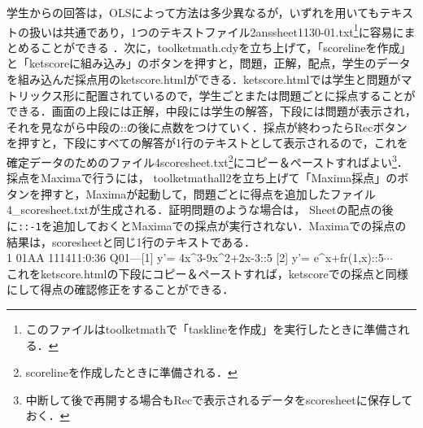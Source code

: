 \documentclass[a4j,12pt]{ujarticle}
\begin{document}
学生からの回答は，OLSによって方法は多少異なるが，いずれを用いてもテキストの扱いは共通であり，1つのテキストファイル2anssheet1130-01.txt\footnote{このファイルはtoolketmathで「tasklineを作成」を実行したときに準備される．}に容易にまとめることができる ．次に，toolketmath.cdyを立ち上げて，「scorelineを作成」と「ketscoreに組み込み」のボタンを押すと，問題，正解，配点，学生のデータを組み込んだ採点用のketscore.htmlができる．ketscore.htmlでは学生と問題がマトリックス形に配置されているので，学生ごとまたは問題ごとに採点することができる．画面の上段には正解，中段には学生の解答，下段には問題が表示され，それを見ながら中段の::の後に点数をつけていく．採点が終わったらRecボタンを押すと，下段にすべての解答が1行のテキストとして表示されるので，これを確定データのためのファイル4scoresheet.txt\footnote{scorelineを作成したときに準備される．}にコピー＆ペーストすればよい\footnote{中断して後で再開する場合もRecで表示されるデータをscoresheetに保存しておく．}．採点をMaximaで行うには，
toolketmathall2を立ち上げて「Maxima採点」のボタンを押すと，Maximaが起動して，問題ごとに得点を追加したファイル%
4\_scoresheet.txtが生成される．証明問題のような場合は，
Sheetの配点の後に\verb|::-1|を追加しておくとMaximaでの採点が実行されない．Maximaでの採点の結果は，scoresheetと同じ1行のテキストである．\\
\hspace*{2zw}%
1 01AA 111411:0:36 Q01---[1] y'=  4x\^{}3-9x\^{}2+2x-3::5 [2] y'=  e\^{}x+fr(1,x)::5$\cdots$\\
これをketscore.htmlの下段にコピー＆ペーストすれば，ketscoreでの採点と同様にして得点の確認修正をすることができる．
\end{document}
